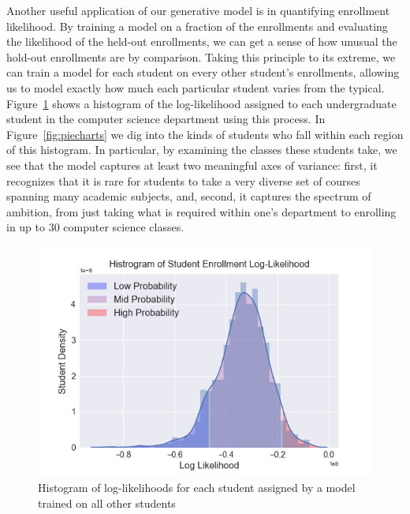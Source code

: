\documentclass{edm_template}
\begin{document}
Another useful application of our generative model is in quantifying enrollment likelihood. By training a model on a fraction of the enrollments and evaluating the likelihood of the held-out enrollments, we can get a sense of how unusual the hold-out enrollments are by comparison. Taking this principle to its extreme, we can train a model for each student on every other student's enrollments, allowing us to model exactly how much each particular student varies from the typical. Figure~\ref{fig:likelihistogram} shows a histogram of the log-likelihood assigned to each undergraduate student in the computer science department using this process. In Figure~\ref{fig:piecharts} we dig into the kinds of students who fall within each region of this histogram. In particular, by examining the classes these students take, we see that the model captures at least two meaningful axes of variance: first, it recognizes that it is rare for students to take a very diverse set of courses spanning many academic subjects, and, second, it captures the spectrum of ambition, from just taking what is required within one's department to enrolling in up to 30 computer science classes. 

\begin{figure}
    \centering
    \includegraphics[scale=0.4]{figures/loglikelihood_hist.png}
    \caption{\label{fig:likelihistogram} Histogram of log-likelihoods for each student assigned by a model trained on all other students}
\end{figure}
\end{document}
